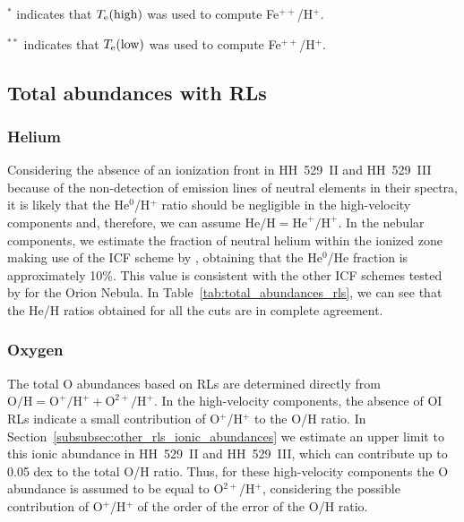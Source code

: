 \documentclass[fleqn,usenatbib]{mnras}
\begin{document}
\begin{table*}
\begin{adjustbox}{width=\textwidth}
\begin{tabular}{ccccccccccccc}
\hline
\end{tabular}
\end{adjustbox}
\begin{description}
\item $^*$ indicates that $T_{\rm e} (\text{high})$ was used to compute Fe$^{++}$/H$^+$. \\
\item $^{**}$ indicates that $T_{\rm e} (\text{low})$ was used to compute Fe$^{++}$/H$^+$. \\
\end{description}
\end{table*}




\subsection{Total abundances with RLs}
\label{subsec:total_rls}



\subsubsection{Helium}
\label{subsubsec:total_abun_he}

Considering the absence of an ionization front in HH~529~II and HH~529~III because of the non-detection of emission lines of neutral elements in their spectra, it is likely that the  He$^{0}$/H$^{+}$ ratio should be  negligible in the high-velocity components and, therefore, we can assume  $\text{He/H}=\text{He}^{+}/\text{H}^{+}$. In the nebular components, we estimate the fraction of neutral helium within the ionized zone making use of the ICF scheme by  \citet{kunthsargent83}, obtaining that the He$^{0}$/He fraction is approximately 10\%. This value is consistent with the other ICF schemes tested by \citet{mendez20} for the Orion Nebula. In Table~\ref{tab:total_abundances_rls}, we can see that the He/H ratios obtained for all the cuts are in complete agreement. 

\subsubsection{Oxygen}
\label{subsubsec:total_abun_o_rls}

The total O abundances based on RLs are determined directly from $\text{O}/\text{H}=\text{O}^{+}/\text{H}^{+}+\text{O}^{2+}/\text{H}^{+}$. In the high-velocity components, the absence of O\thinspace I RLs indicate a small contribution of O$^+$/H$^+$ to the O/H ratio. In Section~\ref{subsubsec:other_rls_ionic_abundances} we estimate an upper limit to this ionic abundance in HH~529~II and HH~529~III, which can contribute up to 0.05 dex to the total O/H ratio. Thus, for these high-velocity components the O abundance is assumed to be equal to  O$^{2+}$/H$^+$, considering the possible contribution of O$^+$/H$^+$ of the order of the error of the O/H ratio.
\end{document}
